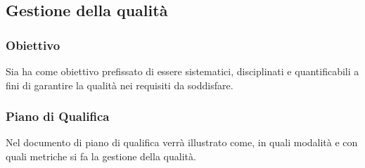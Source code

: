 \subsection{Gestione della qualità}
\subsubsection{Obiettivo}
Sia ha come obiettivo prefissato di essere sistematici, disciplinati e quantificabili a fini di garantire la qualità nei requisiti da soddisfare.

\subsubsection{Piano di Qualifica}
Nel documento di piano di qualifica verrà illustrato come, in quali modalità e con quali metriche si fa la gestione della qualità.